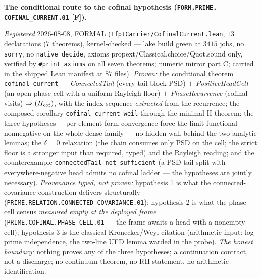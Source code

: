 \par\smallskip\noindent\textbf{The conditional route to the
cofinal hypothesis (\texttt{FORM.PRIME.\allowbreak
COFINAL\_CURRENT.01} [F]).}
{\sloppy
\emph{Registered} 2026-08-08, FORMAL
(\texttt{TfptCarrier/CofinalCurrent.lean}, $13$ declarations
($7$ theorems), kernel-checked --- lake build green at $3415$
jobs, no \texttt{sorry}, no \texttt{native\_decide}, axioms
propext/Classical.choice/Quot.sound only, verified by
\texttt{\#print axioms} on all seven theorems; numeric mirror
 part C; carried in the
shipped Lean manifest at $87$ files).  \emph{Proven:} the
conditional theorem \texttt{cofinal\_current} ---
\emph{ConnectedTail} (every tail block PSD) $+$
\emph{PositiveHeadCell} (an open phase cell with a uniform
Rayleigh floor) $+$ \emph{PhaseRecurrence} (cofinal visits)
$\Rightarrow (H_{\rm cof})$, with the index sequence
\emph{extracted} from the recurrence; the composed corollary
\texttt{cofinal\_current\_weil} through the minimal H theorem:
the three hypotheses $+$ per-element form convergence force the
limit functional nonnegative on the whole dense family --- no
hidden wall behind the two analytic lemmas; the $\delta = 0$
relaxation (the chain consumes only PSD on the cell; the strict
floor is a stronger input than required, typed) and the
Rayleigh reading; and the counterexample
\texttt{connectedTail\_not\_sufficient} (a PSD-tail split with
everywhere-negative head admits no cofinal ladder --- the
hypotheses are jointly necessary).  \emph{Provenance typed, not
proven:} hypothesis 1 is what the connected-covariance
construction delivers structurally
(\texttt{PRIME.RELATION.CONNECTED\_COVARIANCE.01}); hypothesis
2 is what the phase-cell census \emph{measured empty at the
deployed frame} (\texttt{PRIME.COFINAL.PHASE\_CELL.01} ---
the frame awaits a head with a nonempty cell); hypothesis 3 is
the classical Kronecker/Weyl citation (arithmetic input:
log-prime independence, the two-line UFD lemma warded in the
probe).  \emph{The honest boundary:} nothing proves any of the
three hypotheses; a continuation contract, not a discharge; no
continuum theorem, no RH statement, no arithmetic
identification.\par}


